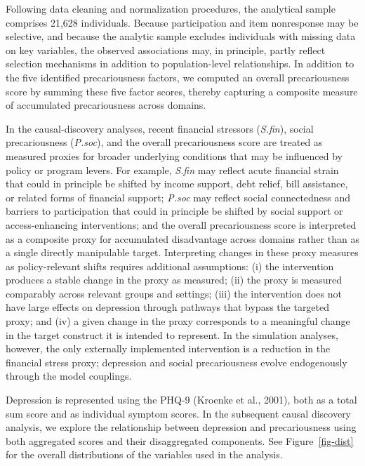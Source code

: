 \documentclass[
]{article}
\begin{document}
Following data cleaning and normalization procedures, the analytical
sample comprises 21,628 individuals. Because participation and item
nonresponse may be selective, and because the analytic sample excludes
individuals with missing data on key variables, the observed
associations may, in principle, partly reflect selection mechanisms in
addition to population-level relationships. In addition to the five
identified precariousness factors, we computed an overall precariousness
score by summing these five factor scores, thereby capturing a composite
measure of accumulated precariousness across domains.

In the causal-discovery analyses, recent financial stressors
(\textit{S.fin}), social precariousness (\textit{P.soc}), and the
overall precariousness score are treated as measured proxies for broader
underlying conditions that may be influenced by policy or program
levers. For example, \textit{S.fin} may reflect acute financial strain
that could in principle be shifted by income support, debt relief, bill
assistance, or related forms of financial support; \textit{P.soc} may
reflect social connectedness and barriers to participation that could in
principle be shifted by social support or access-enhancing
interventions; and the overall precariousness score is interpreted as a
composite proxy for accumulated disadvantage across domains rather than
as a single directly manipulable target. Interpreting changes in these
proxy measures as policy-relevant shifts requires additional
assumptions: (i) the intervention produces a stable change in the proxy
as measured; (ii) the proxy is measured comparably across relevant
groups and settings; (iii) the intervention does not have large effects
on depression through pathways that bypass the targeted proxy; and (iv)
a given change in the proxy corresponds to a meaningful change in the
target construct it is intended to represent. In the simulation
analyses, however, the only externally implemented intervention is a
reduction in the financial stress proxy; depression and social
precariousness evolve endogenously through the model couplings.

Depression is represented using the PHQ-9 (Kroenke et al., 2001), both
as a total sum score and as individual symptom scores. In the subsequent
causal discovery analysis, we explore the relationship between
depression and precariousness using both aggregated scores and their
disaggregated components. See Figure~\ref{fig-dist} for the overall
distributions of the variables used in the analysis.
\end{document}
